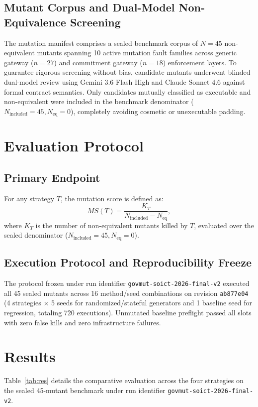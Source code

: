\documentclass[runningheads]{llncs}
\begin{document}
\subsection{Mutant Corpus and Dual-Model Non-Equivalence Screening}
The mutation manifest comprises a sealed benchmark corpus of $N = 45$ non-equivalent mutants spanning 10 active mutation fault families across generic gateway ($n = 27$) and commitment gateway ($n = 18$) enforcement layers. To guarantee rigorous screening without bias, candidate mutants underwent blinded dual-model review using Gemini 3.6 Flash High and Claude Sonnet 4.6 against formal contract semantics. Only candidates mutually classified as executable and non-equivalent were included in the benchmark denominator ($N_{\text{included}} = 45, N_{\text{eq}} = 0$), completely avoiding cosmetic or unexecutable padding.

\section{Evaluation Protocol}
\subsection{Primary Endpoint}
For any strategy $T$, the mutation score is defined as:
\begin{equation}
MS(T) = \frac{K_T}{N_{\text{included}} - N_{\text{eq}}},
\end{equation}
where $K_T$ is the number of non-equivalent mutants killed by $T$, evaluated over the sealed denominator ($N_{\text{included}} = 45, N_{\text{eq}} = 0$).

\subsection{Execution Protocol and Reproducibility Freeze}
The protocol frozen under run identifier \texttt{govmut-soict-2026-final-v2} executed all 45 sealed mutants across 16 method/seed combinations on revision \texttt{ab877e04} (4 strategies $\times$ 5 seeds for randomized/stateful generators and 1 baseline seed for regression, totaling 720 executions). Unmutated baseline preflight passed all slots with zero false kills and zero infrastructure failures.

\section{Results}
Table~\ref{tab:res} details the comparative evaluation across the four strategies on the sealed 45-mutant benchmark under run identifier \texttt{govmut-soict-2026-final-v2}.
\end{document}
